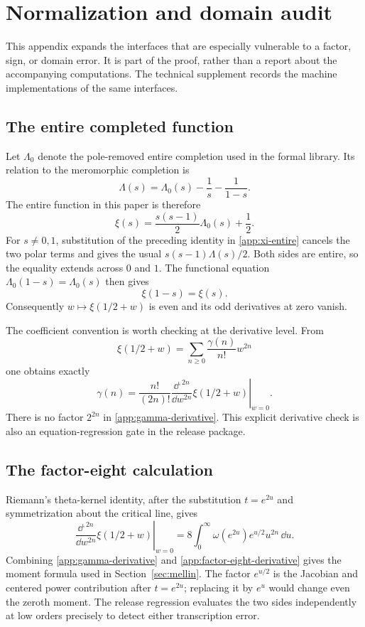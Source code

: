 \section{Normalization and domain audit}\label{app:normalization}

This appendix expands the interfaces that are especially vulnerable to a
factor, sign, or domain error.  It is part of the proof, rather than a report
about the accompanying computations.  The technical supplement records the
machine implementations of the same interfaces.

\subsection{The entire completed function}

Let $\Lambda_0$ denote the pole-removed entire completion used in the formal
library.  Its relation to the meromorphic completion is
\[
 \Lambda(s)=\Lambda_0(s)-\frac1s-\frac1{1-s}.
\]
The entire function in this paper is therefore
\begin{equation}\label{app:xi-entire}
 \xi(s)=\frac{s(s-1)}2\Lambda_0(s)+\frac12.
\end{equation}
For $s\ne0,1$, substitution of the preceding identity in
\eqref{app:xi-entire} cancels the two polar terms and gives the usual
$s(s-1)\Lambda(s)/2$.  Both sides are entire, so the equality extends across
$0$ and $1$.  The functional equation $\Lambda_0(1-s)=\Lambda_0(s)$ then
gives
\[
 \xi(1-s)=\xi(s).
\]
Consequently $w\mapsto\xi(1/2+w)$ is even and its odd derivatives at zero
vanish.

The coefficient convention is worth checking at the derivative level.  From
\[
 \xi(1/2+w)=\sum_{n\ge0}\frac{\gamma(n)}{n!}w^{2n}
\]
one obtains exactly
\begin{equation}\label{app:gamma-derivative}
 \gamma(n)=\frac{n!}{(2n)!}
 \left.\frac{\dd^{,2n}}{\dd w^{2n}}\xi(1/2+w)\right|_{w=0}.
\end{equation}
There is no factor $2^{2n}$ in \eqref{app:gamma-derivative}.  This explicit
derivative check is also an equation-regression gate in the release package.

\subsection{The factor-eight calculation}

Riemann's theta-kernel identity, after the substitution $t=e^{2u}$ and
symmetrization about the critical line, gives
\begin{equation}\label{app:factor-eight-derivative}
 \left.\frac{\dd^{,2n}}{\dd w^{2n}}\xi(1/2+w)\right|_{w=0}
 =8\int_0^\infty\omega(e^{2u})e^{u/2}u^{2n}\,\dd u.
\end{equation}
Combining \eqref{app:gamma-derivative} and
\eqref{app:factor-eight-derivative} gives the moment formula used in
Section~\ref{sec:mellin}.  The factor $e^{u/2}$ is the Jacobian and centered
power contribution after $t=e^{2u}$; replacing it by $e^u$ would change even
the zeroth moment.  The release regression evaluates the two sides
independently at low orders precisely to detect either transcription error.

